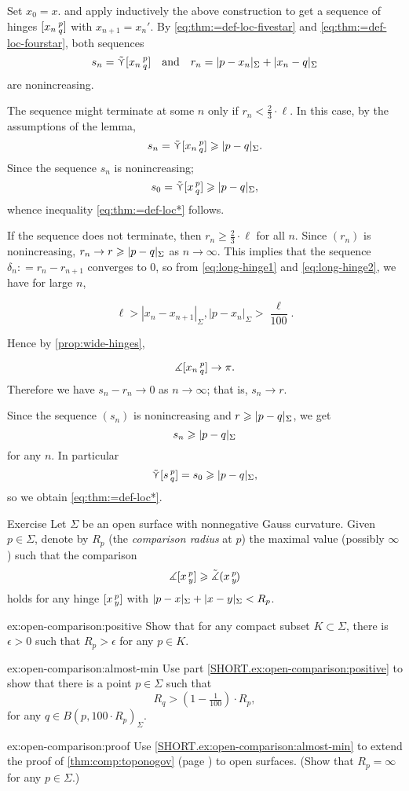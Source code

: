 Set $x_0=x$. and apply inductively the above construction to get a sequence of hinges  $[x_n\,{}^{p}_{q}]$ with $x_{n+1}=x_n'$.
By \ref{eq:thm:=def-loc-fivestar} and \ref{eq:thm:=def-loc-fourstar}, both sequences
\[s_n=\side \hinge{x_n}pq\quad\text{and}\quad r_n=\dist{p}{x_n}\Sigma+\dist{x_n}{q}\Sigma\]
are nonincreasing.

The sequence might terminate at some $n$ only if $r_n< \tfrac{2}{3}\cdot\ell $.
In this case, by the assumptions of the lemma, 
\[s_n=\side \hinge{x_n}p q\ge\dist{p}{q}\Sigma.\]
Since the sequence $s_n$ is nonincreasing;
\[s_0=\side \hinge{x}p q\ge\dist{p}{q}\Sigma,\]
whence inequality \ref{eq:thm:=def-loc*} follows.

If the sequence does not terminate, then $r_n\ge\tfrac{2}{3}\cdot\ell$ for all $n$.
Since $(r_n)$ is nonincreasing, $r_n\to r\ge \dist{p}{q}\Sigma$ as $n\to\infty$. This implies that the sequence $\delta_n : = r_n - r_{n+1}$ converges to $0$, so from \ref{eq:long-hinge1} and \ref{eq:long-hinge2}, we have for large $n$,

\[  \ell >   | x_n-x_{n+1} |_{\Sigma} , | p-x_n| _{\Sigma} > \dfrac{\ell}{100}  .  \]

Hence by  \ref{prop:wide-hinges}, 


\[
\measuredangle[x_n\,{}^{p}_{q}]\to \pi. \]
Therefore we have 
$s_n-r_n\to 0$ as $n\to\infty$;
that is, $s_n\to r$.

Since the sequence $(s_n)$ is nonincreasing and $r\ge \dist{p}{q}\Sigma$, we get
\[s_n\ge \dist{p}{q}\Sigma\]
for any $n$.
In particular
\[\side\hinge spq=s_0\ge \dist{p}{q}\Sigma,\] so we obtain \ref{eq:thm:=def-loc*}.
\qeds

\begin{thm}{Exercise}\label{ex:open-comparison}
Let $\Sigma$ be an open surface with nonnegative Gauss curvature.
Given $p\in\Sigma$, denote by $R_p$ 
(the {}\emph{comparison radius} at $p$) 
the maximal value (possibly $\infty$) such that the comparison 
\[\measuredangle[x\,{}^{p}_{y}]
\geqslant\tilde\measuredangle(x\,{}^{p}_{y}\hspace{-0.2ex})\]
holds for any hinge $[x\,{}^{p}_{y}]$ with $\dist{p}{x}\Sigma+\dist{x}{y}\Sigma<R_p$.

\begin{subthm}{ex:open-comparison:positive}
Show that for any compact subset $K\subset \Sigma$, there is $\epsilon>0$ such that $R_p>\epsilon$ for any $p\in K$.
\end{subthm}

\begin{subthm}{ex:open-comparison:almost-min}
Use part \ref{SHORT.ex:open-comparison:positive} to show that 
there is a point $p\in\Sigma$ such that 
\[R_q>(1-\tfrac1{100})\cdot R_p,\]
for any $q\in B(p,100\cdot R_p)_\Sigma$.
\end{subthm}

\begin{subthm}{ex:open-comparison:proof}
Use \ref{SHORT.ex:open-comparison:almost-min} to extend the proof of \ref{thm:comp:toponogov} (page \pageref{proof(thm:comp:toponogov)}) to open surfaces. 
(Show that $R_p=\infty$ for any $p\in\Sigma$.) 
\end{subthm}


\end{thm}


